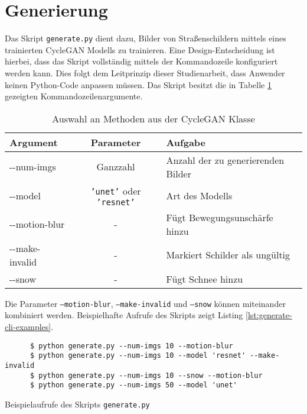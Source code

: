 \section{Generierung}
Das Skript \texttt{generate.py} dient dazu, Bilder von Straßenschildern mittels eines trainierten \ac{CycleGAN} Modells zu trainieren. Eine Design-Entscheidung ist hierbei, dass das Skript vollständig mittels der Kommandozeile konfiguriert werden kann. Dies folgt dem Leitprinzip dieser Studienarbeit, dass Anwender keinen Python-Code anpassen müssen. Das Skript besitzt die in Tabelle \ref{tab:generate-cli} gezeigten Kommandozeilenargumente.
\begin{table}[h]
   \centering
   \begin{tabular}{|l|c|l|}
   \hline
   \textbf{Argument} & \textbf{Parameter} & \textbf{Aufgabe} \\ \hline \hline
   -{}-num-imgs & Ganzzahl & Anzahl der zu generierenden Bilder \\ \hline
   -{}-model & \texttt{'unet'} oder \texttt{'resnet'} & Art des Modells \\ \hline
   -{}-motion-blur & - & Fügt Bewegungsunschärfe hinzu \\ \hline
   -{}-make-invalid & - & Markiert Schilder als ungültig \\ \hline
   -{}-snow & - & Fügt Schnee hinzu \\
   \hline
   \end{tabular}
   \caption{Auswahl an Methoden aus der CycleGAN Klasse}
   \label{tab:generate-cli}
\end{table}
Die Parameter \texttt{--motion-blur}, \texttt{--make-invalid} und \texttt{--snow} können miteinander kombiniert werden. Beispielhafte Aufrufe des Skripts zeigt Listing \ref{lst:generate-cli-examples}.
\begin{samepage}
\begin{code}
   \begin{verbatim}
      $ python generate.py --num-imgs 10 --motion-blur
      $ python generate.py --num-imgs 10 --model 'resnet' --make-invalid
      $ python generate.py --num-imgs 10 --snow --motion-blur
      $ python generate.py --num-imgs 50 --model 'unet'
   \end{verbatim}
   \caption{Beispielaufrufe des Skripts \lstinline[language=python]{generate.py}}
   \label{lst:generate-cli-examples}
\end{code}
\end{samepage}

